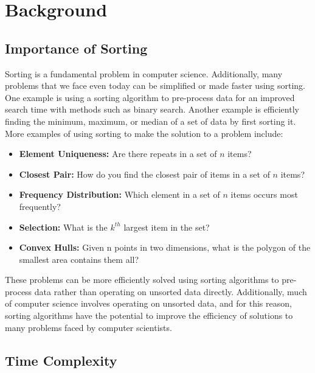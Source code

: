 \documentclass[a4paper]{article}
\begin{document}
\section{Background}

\subsection{Importance of Sorting}

Sorting is a fundamental problem in computer science. Additionally, many problems that we face even today can be simplified or made faster using sorting. One example is using a sorting algorithm to pre-process data for an improved search time with methods such as binary search. Another example is efficiently finding the minimum, maximum, or median of a set of data by first sorting it. More examples of using sorting to make the solution to a problem include:

\begin{itemize}
\item \textbf{Element Uniqueness:} Are there repeats in a set of $n$ items?

\item{\textbf{Closest Pair:} How do you find the closest pair of items in a set of $n$ items?}

\item \textbf{Frequency Distribution:} Which element in a set of $n$ items occurs most frequently?

\item \textbf{Selection:} What is the $k^{th}$ largest item in the set?

\item \textbf{Convex Hulls:} Given n points in two dimensions, what is the polygon of the smallest area contains them all?
\end{itemize}

These problems can be more efficiently solved using sorting algorithms to pre-process data rather than operating on unsorted data directly. Additionally, much of computer science involves operating on unsorted data, and for this reason, sorting algorithms have the potential to improve the efficiency of solutions to many problems faced by computer scientists.

\subsection{Time Complexity}
\end{document}
